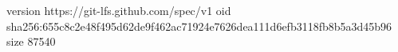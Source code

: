 version https://git-lfs.github.com/spec/v1
oid sha256:655c8c2e48f495d62de9f462ac71924e7626dea111d6efb3118fb8b5a3d45b96
size 87540
